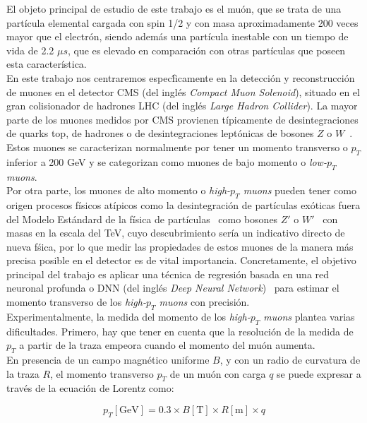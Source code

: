 
El objeto principal de estudio de este trabajo es el mu\'on, que se trata de una part\'icula elemental cargada con spin 1/2 y con masa aproximadamente 200 veces mayor que el electr\'on, siendo adem\'as una part\'icula inestable con un tiempo de vida de 2.2 $\mu s$, que es elevado en comparaci\'on con otras part\'iculas que poseen esta caracter\'istica. \\

En este trabajo nos centraremos espec\'ficamente en la detecci\'on y reconstrucci\'on de muones en el detector CMS (del ingl\'es \textit{Compact Muon Solenoid}), situado en el gran colisionador de hadrones LHC (del ingl\'es \textit{Large Hadron Collider}). La mayor parte de los muones medidos por CMS provienen t\'ipicamente de desintegraciones de quarks top, de hadrones o de desintegraciones lept\'onicas de bosones $Z$ o $W$~\cite{PhysRevD.98.030001}. Estos muones se caracterizan normalmente por tener un momento transverso o $p_{T}$ inferior a 200 GeV y se categorizan como muones de bajo momento o \textit{low-$p_{T}$ muons}. \\
Por otra parte, los muones de alto momento o \textit{high-$p_{T}$ muons} pueden tener como origen procesos f\'isicos at\'ipicos como la desintegraci\'on de part\'iculas ex\'oticas fuera del Modelo Est\'andard de la f\'isica de part\'iculas~\cite{gaillard1999standard} como bosones $Z'$ o $W'$~\cite{CMS-PAS-EXO-19-019,2017278} con masas en la escala del TeV, cuyo descubrimiento ser\'ia un indicativo directo de nueva f\'sica, por lo que medir las propiedades de estos muones de la manera m\'as precisa posible en el detector es de vital importancia. Concretamente, el objetivo principal del trabajo es aplicar una t\'ecnica de regresi\'on basada en una red neuronal profunda o DNN (del ingl\'es \textit{Deep Neural Network})~\cite{Schmidhuber:2015} para estimar el momento transverso de los \textit{high-$p_{T}$ muons} con precisi\'on. \\

Experimentalmente, la medida del momento de los \textit{high-$p_{T}$ muons} plantea varias dificultades. Primero, hay que tener en cuenta que la resoluci\'on de la medida de $p_{T}$ a partir de la traza empeora cuando el momento del mu\'on aumenta. \\
En presencia de un campo magn\'etico uniforme $B$, y con un radio de curvatura de la traza $R$, el momento transverso $p_{T}$ de un mu\'on con carga $q$ se puede expresar a trav\'es de la ecuaci\'on de Lorentz como:

\begin{equation}
  p_{T}[\text{GeV}] = 0.3 \times B[\text{T}] \times R[\text{m}] \times q
\label{eq:pTvsRadius}
\end{equation}

